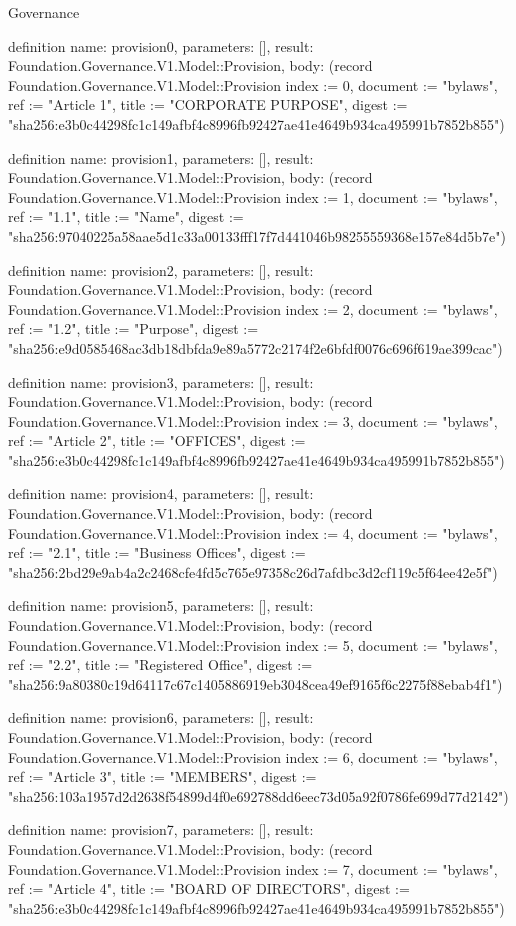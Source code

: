 \begin{lexlean}{Governance}
\begin{semanticmodule}
definition{
  name: provision0,
  parameters: [],
  result: Foundation.Governance.V1.Model::Provision,
  body: (record Foundation.Governance.V1.Model::Provision {index := 0, document := "bylaws", ref := "Article 1", title := "CORPORATE PURPOSE", digest := "sha256:e3b0c44298fc1c149afbf4c8996fb92427ae41e4649b934ca495991b7852b855"})
}

definition{
  name: provision1,
  parameters: [],
  result: Foundation.Governance.V1.Model::Provision,
  body: (record Foundation.Governance.V1.Model::Provision {index := 1, document := "bylaws", ref := "1.1", title := "Name", digest := "sha256:97040225a58aae5d1c33a00133fff17f7d441046b98255559368e157e84d5b7e"})
}

definition{
  name: provision2,
  parameters: [],
  result: Foundation.Governance.V1.Model::Provision,
  body: (record Foundation.Governance.V1.Model::Provision {index := 2, document := "bylaws", ref := "1.2", title := "Purpose", digest := "sha256:e9d0585468ac3db18dbfda9e89a5772c2174f2e6bfdf0076c696f619ae399cac"})
}

definition{
  name: provision3,
  parameters: [],
  result: Foundation.Governance.V1.Model::Provision,
  body: (record Foundation.Governance.V1.Model::Provision {index := 3, document := "bylaws", ref := "Article 2", title := "OFFICES", digest := "sha256:e3b0c44298fc1c149afbf4c8996fb92427ae41e4649b934ca495991b7852b855"})
}

definition{
  name: provision4,
  parameters: [],
  result: Foundation.Governance.V1.Model::Provision,
  body: (record Foundation.Governance.V1.Model::Provision {index := 4, document := "bylaws", ref := "2.1", title := "Business Offices", digest := "sha256:2bd29e9ab4a2c2468cfe4fd5c765e97358c26d7afdbc3d2cf119c5f64ee42e5f"})
}

definition{
  name: provision5,
  parameters: [],
  result: Foundation.Governance.V1.Model::Provision,
  body: (record Foundation.Governance.V1.Model::Provision {index := 5, document := "bylaws", ref := "2.2", title := "Registered Office", digest := "sha256:9a80380c19d64117c67c1405886919eb3048cea49ef9165f6c2275f88ebab4f1"})
}

definition{
  name: provision6,
  parameters: [],
  result: Foundation.Governance.V1.Model::Provision,
  body: (record Foundation.Governance.V1.Model::Provision {index := 6, document := "bylaws", ref := "Article 3", title := "MEMBERS", digest := "sha256:103a1957d2d2638f54899d4f0e692788dd6eec73d05a92f0786fe699d77d2142"})
}

definition{
  name: provision7,
  parameters: [],
  result: Foundation.Governance.V1.Model::Provision,
  body: (record Foundation.Governance.V1.Model::Provision {index := 7, document := "bylaws", ref := "Article 4", title := "BOARD OF DIRECTORS", digest := "sha256:e3b0c44298fc1c149afbf4c8996fb92427ae41e4649b934ca495991b7852b855"})
}


\end{semanticmodule}
\end{lexlean}
